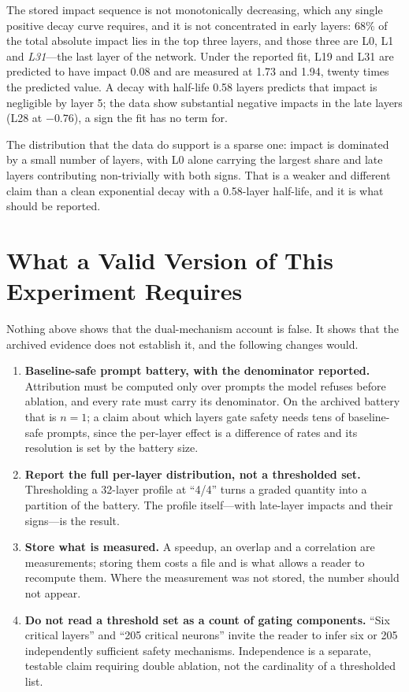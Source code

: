 \documentclass[11pt]{article}
\begin{document}
The stored impact sequence is not monotonically decreasing, which any single positive decay curve requires, and it is not concentrated in early layers: $68\%$ of the total absolute impact lies in the top three layers, and those three are L0, L1 and \emph{L31}---the last layer of the network. Under the reported fit, L19 and L31 are predicted to have impact $0.08$ and are measured at 1.73 and 1.94, twenty times the predicted value. A decay with half-life 0.58 layers predicts that impact is negligible by layer 5; the data show substantial negative impacts in the late layers (L28 at $-0.76$), a sign the fit has no term for.

The distribution that the data do support is a sparse one: impact is dominated by a small number of layers, with L0 alone carrying the largest share and late layers contributing non-trivially with both signs. That is a weaker and different claim than a clean exponential decay with a 0.58-layer half-life, and it is what should be reported.

\section{What a Valid Version of This Experiment Requires}
Nothing above shows that the dual-mechanism account is false. It shows that the archived evidence does not establish it, and the following changes would.

\begin{enumerate}
\item \textbf{Baseline-safe prompt battery, with the denominator reported.} Attribution must be computed only over prompts the model refuses before ablation, and every rate must carry its denominator. On the archived battery that is $n=1$; a claim about which layers gate safety needs tens of baseline-safe prompts, since the per-layer effect is a difference of rates and its resolution is set by the battery size.
\item \textbf{Report the full per-layer distribution, not a thresholded set.} Thresholding a 32-layer profile at ``4/4'' turns a graded quantity into a partition of the battery. The profile itself---with late-layer impacts and their signs---is the result.
\item \textbf{Store what is measured.} A speedup, an overlap and a correlation are measurements; storing them costs a file and is what allows a reader to recompute them. Where the measurement was not stored, the number should not appear.
\item \textbf{Do not read a threshold set as a count of gating components.} ``Six critical layers'' and ``205 critical neurons'' invite the reader to infer six or 205 independently sufficient safety mechanisms. Independence is a separate, testable claim requiring double ablation, not the cardinality of a thresholded list.
\end{enumerate}
\end{document}
